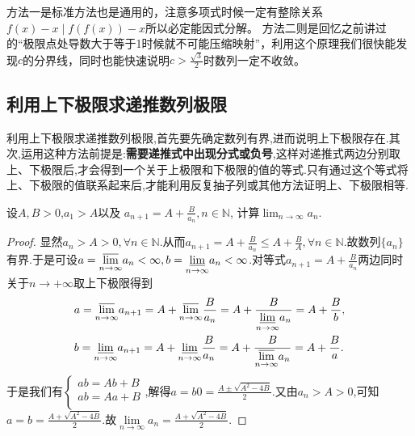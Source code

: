 \documentclass[../../main.tex]{subfiles}
\begin{document}
\begin{remark}
{\color{blue}方法一}是标准方法也是通用的，注意多项式时候一定有整除关系\(f(x) - x\mid f(f(x)) - x\)所以必定能因式分解。
{\color{blue}方法二}则是回忆之前讲过的“极限点处导数大于等于1时候就不可能压缩映射”，利用这个原理我们很快能发现\(c\)的分界线，同时也能快速说明\(c>\frac{\sqrt{3}}{2}\)时数列一定不收敛。
\end{remark}







\subsection{利用上下极限求递推数列极限}

利用上下极限求递推数列极限,首先要先确定数列有界,进而说明上下极限存在.其次,运用这种方法前提是:\textbf{需要递推式中出现分式或负号},这样对递推式两边分别取上、下极限后,才会得到一个关于上极限和下极限的值的等式.只有通过这个等式将上、下极限的值联系起来后,才能利用反复抽子列或其他方法证明上、下极限相等.

\begin{example}
设\(A,B > 0\),\(a_1 > A\)以及
\(a_{n + 1} = A + \frac{B}{a_n}, n \in \mathbb{N}\),
计算\(\lim_{n \to \infty} a_n\).
\end{example}
\begin{proof}
显然$a_n>A>0,\forall n\in\mathbb{N}$.从而$a_{n+1}=A+\frac{B}{a_n}\leqslant  A+\frac{B}{A},\forall n\in\mathbb{N}$.故数列$\{a_n\}$有界.于是可设$a=\underset{n\rightarrow \infty}{{\varlimsup }}a_n<\infty,b=\underset{n\rightarrow \infty}{{\varliminf }}a_n<\infty$.对等式$a_{n + 1} = A + \frac{B}{a_n}$两边同时关于$n\to+\infty$取上下极限得到
\begin{align*}
&a=\underset{n\rightarrow \infty}{{\varlimsup }}a_{n+1}=A+\underset{n\rightarrow \infty}{{\varlimsup }}\frac{B}{a_n}=A+\frac{B}{\underset{n\rightarrow \infty}{{\varliminf }}a_n}=A+\frac{B}{b},
\\
&b=\underset{n\rightarrow \infty}{{\varliminf }}a_{n+1}=A+\underset{n\rightarrow \infty}{{\varliminf }}\frac{B}{a_n}=A+\frac{B}{\underset{n\rightarrow \infty}{{\varlimsup }}a_n}=A+\frac{B}{a}.
\end{align*}
于是我们有$\begin{cases}
ab=Ab+B\\
ab=Aa+B\\
\end{cases}$,解得$a=b0=\frac{A\pm\sqrt{A^2-4B}}{2}$.又由$a_n>A>0$,可知$a=b=\frac{A+\sqrt{A^2-4B}}{2}$.故$\underset{n\rightarrow \infty}{\lim}a_n=\frac{A+\sqrt{A^2-4B}}{2}$.

\end{proof}
\end{document}
